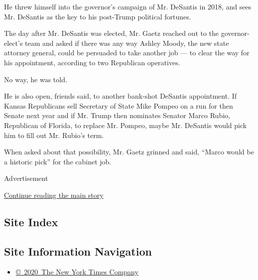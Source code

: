He threw himself into the governor's campaign of Mr. DeSantis in 2018,
and sees Mr. DeSantis as the key to his post-Trump political fortunes.

The day after Mr. DeSantis was elected, Mr. Gaetz reached out to the
governor-elect's team and asked if there was any way Ashley Moody, the
new state attorney general, could be persuaded to take another job ---
to clear the way for his appointment, according to two Republican
operatives.

No way, he was told.

He is also open, friends said, to another bank-shot DeSantis
appointment. If Kansas Republicans sell Secretary of State Mike Pompeo
on a run for then Senate next year and if Mr. Trump then nominates
Senator Marco Rubio, Republican of Florida, to replace Mr. Pompeo, maybe
Mr. DeSantis would pick him to fill out Mr. Rubio's term.

When asked about that possibility, Mr. Gaetz grinned and said, ``Marco
would be a historic pick'' for the cabinet job.

Advertisement

\protect\hyperlink{after-bottom}{Continue reading the main story}

\hypertarget{site-index}{%
\subsection{Site Index}\label{site-index}}

\hypertarget{site-information-navigation}{%
\subsection{Site Information
Navigation}\label{site-information-navigation}}

\begin{itemize}
\tightlist
\item
  \href{https://help.nytimes3xbfgragh.onion/hc/en-us/articles/115014792127-Copyright-notice}{©~2020~The
  New York Times Company}
\end{itemize}

